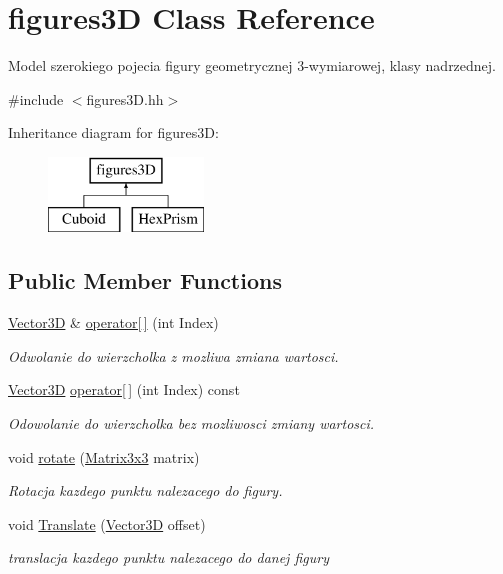 \hypertarget{classfigures3_d}{}\section{figures3D Class Reference}
\label{classfigures3_d}


Model szerokiego pojecia figury geometrycznej 3-\/wymiarowej, klasy nadrzednej.  




{\ttfamily \#include $<$figures3\+D.\+hh$>$}

Inheritance diagram for figures3D\+:\begin{figure}[H]
\begin{center}
\leavevmode
\includegraphics[height=2.000000cm]{classfigures3_d}
\end{center}
\end{figure}
\subsection*{Public Member Functions}
\begin{DoxyCompactItemize}
\item 
\hyperlink{vector3_d_8hh_a8790ef07836c1639da216f46501979c0}{Vector3D} \& \hyperlink{classfigures3_d_af35b8d1711f6fe2738af86d2641ce5aa}{operator\mbox{[}$\,$\mbox{]}} (int Index)
\begin{DoxyCompactList}\small\item\em Odwolanie do wierzcholka z mozliwa zmiana wartosci. \end{DoxyCompactList}\item 
\hyperlink{vector3_d_8hh_a8790ef07836c1639da216f46501979c0}{Vector3D} \hyperlink{classfigures3_d_adee2c4a6f78ee8deb5b57194ef3025d8}{operator\mbox{[}$\,$\mbox{]}} (int Index) const 
\begin{DoxyCompactList}\small\item\em Odowolanie do wierzcholka bez mozliwosci zmiany wartosci. \end{DoxyCompactList}\item 
void \hyperlink{classfigures3_d_a630645770668a4a1b35762a311db39b8}{rotate} (\hyperlink{matrix3x3_8hh_ae0d6db325717593a1d1157ecfa156f13}{Matrix3x3} matrix)
\begin{DoxyCompactList}\small\item\em Rotacja kazdego punktu nalezacego do figury. \end{DoxyCompactList}\item 
void \hyperlink{classfigures3_d_a6fddc70b227f21d8c32b0f741b536b05}{Translate} (\hyperlink{vector3_d_8hh_a8790ef07836c1639da216f46501979c0}{Vector3D} offset)
\begin{DoxyCompactList}\small\item\em translacja kazdego punktu nalezacego do danej figury \end{DoxyCompactList}\end{DoxyCompactItemize}
